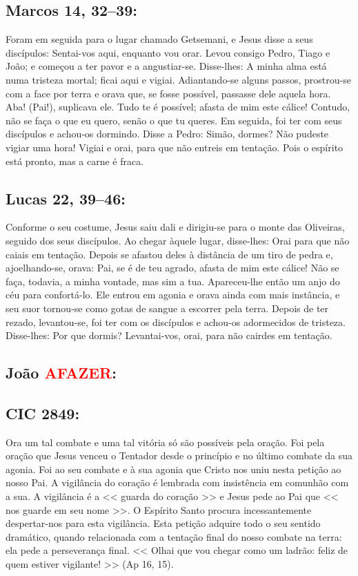 \documentclass[10pt,a5paper]{book}
\newcommand{\from}[1]{\subsection*{#1}}
\newcommand{\TODO}{\textcolor{red}{\ttfamily AFAZER}}
\begin{document}
\from{Marcos 14, 32--39:}

Foram em seguida para o lugar chamado Getsemani, e Jesus disse a seus discípulos: Sentai-vos aqui, enquanto vou orar.
Levou consigo Pedro, Tiago e João; e começou a ter pavor e a angustiar-se.
Disse-lhes: A minha alma está numa tristeza mortal; ficai aqui e vigiai.
Adiantando-se alguns passos, prostrou-se com a face por terra e orava que, se fosse possível, passasse dele aquela hora.
Aba! (Pai!), suplicava ele. Tudo te é possível; afasta de mim este cálice! Contudo, não se faça o que eu quero, senão o que tu queres.
Em seguida, foi ter com seus discípulos e achou-os dormindo. Disse a Pedro: Simão, dormes? Não pudeste vigiar uma hora!
Vigiai e orai, para que não entreis em tentação. Pois o espírito está pronto, mas a carne é fraca.

\from{Lucas 22, 39--46:}

Conforme o seu costume, Jesus saiu dali e dirigiu-se para o monte das Oliveiras, seguido dos seus discípulos.
Ao chegar àquele lugar, disse-lhes: Orai para que não caiais em tentação.
Depois se afastou deles à distância de um tiro de pedra e, ajoelhando-se, orava:
Pai, se é de teu agrado, afasta de mim este cálice! Não se faça, todavia, a minha vontade, mas sim a tua.
Apareceu-lhe então um anjo do céu para confortá-lo.
Ele entrou em agonia e orava ainda com mais instância, e seu suor tornou-se como gotas de sangue a escorrer pela terra.
Depois de ter rezado, levantou-se, foi ter com os discípulos e achou-os adormecidos de tristeza.
Disse-lhes: Por que dormis? Levantai-vos, orai, para não cairdes em tentação.

\from{João \TODO:}

\from{CIC 2849:}

Ora um tal combate e uma tal vitória só são possíveis pela oração.
Foi pela oração que Jesus venceu o Tentador desde o princípio e no último combate da sua agonia.
Foi ao seu combate e à sua agonia que Cristo nos uniu nesta petição ao nosso Pai.
A vigilância do coração é lembrada com insistência em comunhão com a sua.
A vigilância é a << guarda do coração >> e Jesus pede ao Pai que << nos guarde em seu nome >>.
O Espírito Santo procura incessantemente despertar-nos para esta vigilância.
Esta petição adquire todo o seu sentido dramático, quando relacionada com a tentação final do nosso combate na terra:
ela pede a perseverança final.
<< Olhai que vou chegar como um ladrão: feliz de quem estiver vigilante! >> (Ap 16, 15).

\end{document}
